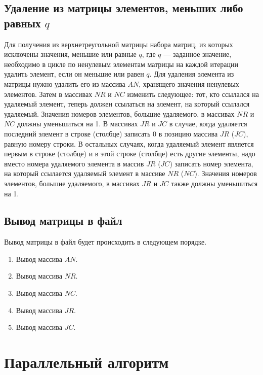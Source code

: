 \subsection{Удаление из матрицы элементов, меньших либо равных $q$}

Для получения из верхнетреугольной матрицы набора матриц, из которых исключены значения, меньшие или равные $q$, где $q$ --- заданное значение, необходимо в цикле по ненулевым элементам матрицы на каждой итерации удалить элемент, если он меньшие или равен $q$. Для удаления элемента из матрицы нужно удалить его из массива $AN$, хранящего значения ненулевых элементов. Затем в массивах $NR$ и $NC$ изменить следующее: тот, кто ссылался на удаляемый элемент, теперь должен ссылаться на элемент, на который ссылался удаляемый. Значения номеров элементов, большие удаляемого, в массивах $NR$ и $NC$ должны уменьшиться на 1. В массивах $JR$ и $JC$ в случае, когда удаляется последний элемент в строке (столбце) записать 0 в позицию массива $JR$ ($JC$), равную номеру строки. В остальных случаях, когда удаляемый элемент является первым в строке (столбце) и в этой строке (столбце) есть другие элементы, надо вместо номера удаляемого элемента в массив $JR$ ($JC$) записать номер элемента, на который ссылается удаляемый элемент в массиве $NR$ ($NC$). Значения номеров элементов, большие удаляемого, в массивах $JR$ и $JC$ также должны уменьшиться на 1.

\subsection{Вывод матрицы в файл}

Вывод матрицы в файл будет происходить в следующем порядке.
\begin{enumerate}
	\item Вывод массива $AN$.
	\item Вывод массива $NR$.
	\item Вывод массива $NC$.
	\item Вывод массива $JR$.
	\item Вывод массива $JC$.
\end{enumerate}

\section{Параллельный алгоритм}

